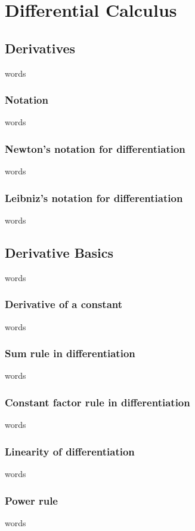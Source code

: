 \chapter{Differential Calculus}


\section{Derivatives}
words

\subsection{Notation}
words

\subsection{Newton's notation for differentiation}
words

\subsection{Leibniz's notation for differentiation}
words

\section{Derivative Basics}
words

\subsection{Derivative of a constant}
words

\subsection{Sum rule in differentiation}
words

\subsection{Constant factor rule in differentiation}
words

\subsection{Linearity of differentiation}
words

\subsection{Power rule}
words

